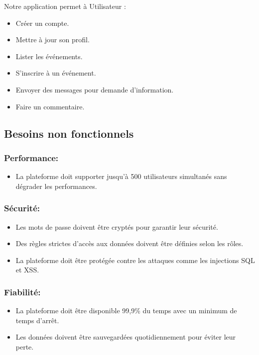 Notre application permet à Utilisateur :
\begin{itemize}
    \item Créer un compte.
    \item Mettre à jour son profil.
    \item Lister les événements.
    \item S’inscrire à un événement.
    \item Envoyer des messages pour demande d'information.
    \item Faire un commentaire.
\end{itemize}

\subsection{Besoins non fonctionnels}

\subsubsection*{Performance:}
\begin{itemize}
    \item La plateforme doit supporter jusqu’à 500 utilisateurs simultanés sans dégrader les performances.
\end{itemize}

\subsubsection*{Sécurité:}
\begin{itemize}
    \item Les mots de passe doivent être cryptés pour garantir leur sécurité.
    \item Des règles strictes d’accès aux données doivent être définies selon les rôles.
    \item La plateforme doit être protégée contre les attaques comme les injections SQL et XSS.
\end{itemize}

\subsubsection*{Fiabilité:}
\begin{itemize}
    \item La plateforme doit être disponible 99,9\% du temps avec un minimum de temps d’arrêt.
    \item Les données doivent être sauvegardées quotidiennement pour éviter leur perte.
\end{itemize}

